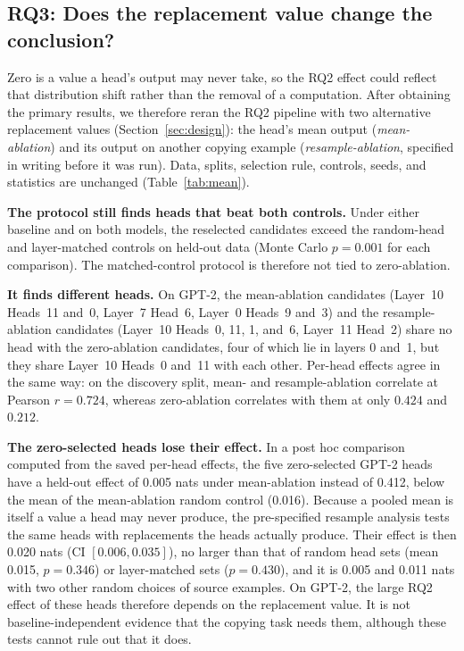 \documentclass{article}
\begin{document}
\subsection{RQ3: Does the replacement value change the conclusion?}
\label{sec:mean}

Zero is a value a head's output may never take, so the RQ2 effect could
reflect that distribution shift rather than the removal of a
computation. After obtaining the primary results, we therefore reran the
RQ2 pipeline with two alternative replacement values
(Section~\ref{sec:design}): the head's mean output
(\emph{mean-ablation}) and its output on another copying example
(\emph{resample-ablation}, specified in writing before it was run). Data,
splits, selection rule, controls, seeds, and statistics are unchanged
(Table~\ref{tab:mean}).

\textbf{The protocol still finds heads that beat both controls.} Under
either baseline and on both models, the reselected candidates exceed the
random-head and layer-matched controls on held-out data (Monte Carlo
$p=0.001$ for each comparison). The matched-control protocol is
therefore not tied to zero-ablation.

\textbf{It finds different heads.} On GPT-2, the mean-ablation
candidates (Layer~10 Heads~11 and~0, Layer~7 Head~6, Layer~0 Heads~9
and~3) and the resample-ablation candidates (Layer~10 Heads~0, 11, 1,
and~6, Layer~11 Head~2) share no head with the zero-ablation candidates,
four of which lie in layers 0 and~1, but they share Layer~10 Heads~0
and~11 with each other. Per-head effects agree in the same way: on the
discovery split, mean- and resample-ablation correlate at Pearson
$r=0.724$, whereas zero-ablation correlates with them at only $0.424$
and $0.212$.

\textbf{The zero-selected heads lose their effect.} In a post hoc
comparison computed from the saved per-head effects, the five
zero-selected GPT-2 heads have a held-out effect of 0.005 nats under
mean-ablation instead of 0.412, below the mean of the mean-ablation
random control (0.016). Because a pooled mean is itself a value a head
may never produce, the pre-specified resample analysis tests the same
heads with replacements the heads actually produce. Their effect is
then 0.020 nats (CI $[0.006,0.035]$), no larger than that of random head
sets (mean 0.015, $p=0.346$) or layer-matched sets ($p=0.430$), and it
is 0.005 and 0.011 nats with two other random choices of source
examples. On GPT-2, the large RQ2 effect of these heads therefore
depends on the replacement value. It is not baseline-independent
evidence that the copying task needs them, although these tests cannot
rule out that it does.
\end{document}
